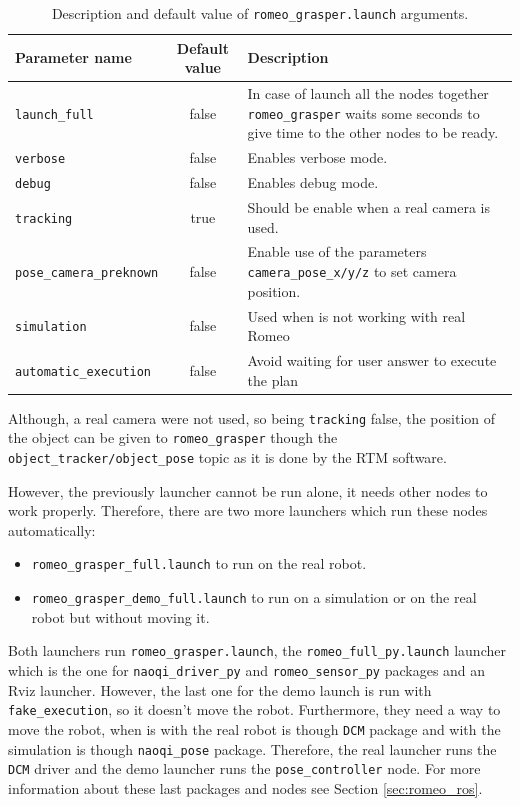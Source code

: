 \documentclass[12pt,a4paper,final,twoside,openright]{report}
\begin{document}
\begin{table}[!h]
\begin{center}
\begin{tabulary}{0.9\textwidth}{|l|c|J|}
\hline
\textbf{Parameter name} & \textbf{Default value} & \textbf{Description} \\ \hline
\texttt{launch\_full} & false & In case of launch all the nodes together \texttt{romeo\_grasper} waits some seconds to give time to the other nodes to be ready.\\ \hline
\texttt{verbose} & false & Enables verbose mode.\\ \hline
\texttt{debug} & false & Enables debug mode.\\ \hline
\texttt{tracking} & true & Should be enable when a real camera is used.\\ \hline
\texttt{pose\_camera\_preknown} & false & Enable use of the parameters \texttt{camera\_pose\_x/y/z} to set camera position.\\ \hline
\texttt{simulation} & false & Used when is not working with real Romeo\\ \hline
\texttt{automatic\_execution} & false & Avoid waiting for user answer to execute the plan\\ \hline
\end{tabulary}
\caption{Description and default value of \texttt{romeo\_grasper.launch} arguments.\label{tab:arg_launch_romeo_grasper}}
\end{center}
\end{table}

Although, a real camera were not used, so being \texttt{tracking} false, the position of the object can be given to \texttt{romeo\_grasper} though the \texttt{object\_tracker/object\_pose} topic as it is done by the RTM software.

However, the previously launcher cannot be run alone, it needs other nodes to work properly. Therefore, there are two more launchers which run these nodes automatically: 
\begin{itemize}
\item \texttt{romeo\_grasper\_full.launch} to run on the real robot.
\item \texttt{romeo\_grasper\_demo\_full.launch} to run on a simulation or on the real robot but without moving it.
\end{itemize}

Both launchers run \texttt{romeo\_grasper.launch}, the \texttt{romeo\_full\_py.launch} launcher which is the one for \texttt{naoqi\_driver\_py} and \texttt{romeo\_sensor\_py} packages and an Rviz launcher. However, the last one for the demo launch is run with \texttt{fake\_execution}, so it doesn't move the robot. Furthermore, they need a way to move the robot, when is with the real robot is though \texttt{DCM} package and with the simulation is though \texttt{naoqi\_pose} package. Therefore, the real launcher runs the \texttt{DCM} driver and the demo launcher runs the \texttt{pose\_controller} node. For more information about these last packages and nodes see Section \ref{sec:romeo_ros}.
\end{document}
